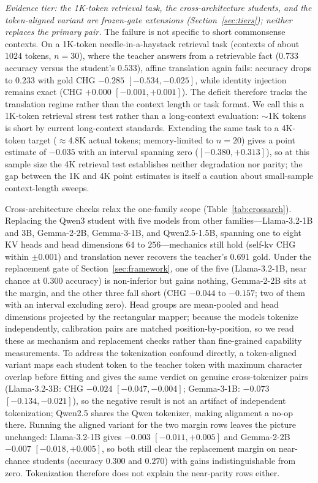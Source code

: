 \documentclass[10pt]{article}
\begin{document}
\emph{Evidence tier: the 1K-token retrieval task, the cross-architecture students, and
the token-aligned variant are frozen-gate extensions (Section~\ref{sec:tiers});
neither replaces the primary pair.}
The failure is not specific to short commonsense contexts. On a 1K-token
needle-in-a-haystack retrieval task (contexts of about $1024$ tokens,
$n{=}30$), where the teacher answers from a retrievable fact ($0.733$ accuracy
versus the student's $0.533$), affine translation again fails: accuracy drops
to $0.233$ with gold CHG $-0.285$ $[-0.534, -0.025]$, while identity injection
remains exact (CHG $+0.000$ $[-0.001, +0.001]$). The deficit therefore tracks
the translation regime rather than the context length or task format. We call
this a 1K-token retrieval stress test rather than a long-context evaluation:
$\sim$1K tokens is short by current long-context standards. Extending the same
task to a 4K-token target ($\approx$4.8K actual tokens; memory-limited to
$n{=}20$) gives a point estimate of
$-0.035$ with an interval spanning zero ($[-0.380, +0.313]$), so at this sample
size the 4K retrieval test establishes neither degradation nor parity; the gap
between the 1K and 4K point estimates is itself a caution about small-sample
context-length sweeps.

Cross-architecture checks relax the one-family scope
(Table~\ref{tab:crossarch}). Replacing the Qwen3 student with five models from
other families---Llama-3.2-1B and 3B, Gemma-2-2B, Gemma-3-1B, and
Qwen2.5-1.5B, spanning one to eight KV heads and head dimensions $64$ to
$256$---mechanics still hold (self-kv CHG within $\pm0.001$) and translation
never recovers the teacher's $0.691$ gold. Under the replacement gate of
Section~\ref{sec:framework}, one of the five (Llama-3.2-1B, near chance at
$0.300$ accuracy) is non-inferior but gains nothing, Gemma-2-2B sits at the
margin, and the other three fall short (CHG $-0.044$ to $-0.157$; two of them
with an interval excluding zero). Head groups are mean-pooled and head
dimensions projected by the rectangular mapper; because the models tokenize
independently, calibration pairs are matched position-by-position, so we read
these as mechanism and replacement checks rather than fine-grained capability
measurements. To address the tokenization confound directly, a token-aligned
variant maps each student token to the teacher token with maximum character
overlap before fitting and gives the same verdict on genuine cross-tokenizer
pairs (Llama-3.2-3B: CHG $-0.024$ $[-0.047,-0.004]$; Gemma-3-1B: $-0.073$
$[-0.134,-0.021]$), so the negative result is not an artifact of independent
tokenization; Qwen2.5 shares the Qwen tokenizer, making alignment a no-op
there. Running the aligned variant for the two margin rows leaves the picture
unchanged: Llama-3.2-1B gives $-0.003$ $[-0.011,+0.005]$ and Gemma-2-2B
$-0.007$ $[-0.018,+0.005]$, so both still clear the replacement margin on
near-chance students (accuracy $0.300$ and $0.270$) with gains indistinguishable
from zero. Tokenization therefore does not explain the near-parity rows either.
\end{document}
